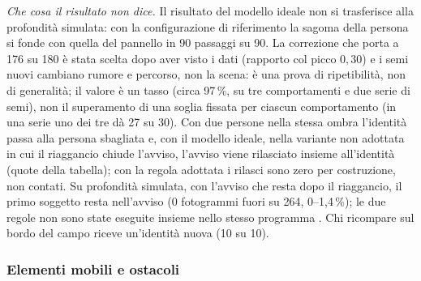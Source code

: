 \emph{Che cosa il risultato non dice.} Il risultato del modello ideale non si trasferisce alla profondità simulata: con la configurazione di riferimento la sagoma della persona si fonde con quella del pannello in 90 passaggi su 90. La correzione che porta a 176 su 180 è stata scelta dopo aver visto i dati (rapporto col picco $0{,}30$) e i semi nuovi cambiano rumore e percorso, non la scena: è una prova di ripetibilità, non di generalità; il valore è un tasso (circa 97\,\%, su tre comportamenti e due serie di semi), non il superamento di una soglia fissata per ciascun comportamento (in una serie uno dei tre dà 27 su 30). Con due persone nella stessa ombra l'identità passa alla persona sbagliata e, con il modello ideale, nella variante non adottata in cui il riaggancio chiude l'avviso, l'avviso viene rilasciato insieme all'identità (quote della tabella); con la regola adottata i rilasci sono zero per costruzione, non contati. Su profondità simulata, con l'avviso che resta dopo il riaggancio, il primo soggetto resta nell'avviso (0 fotogrammi fuori su 264, 0–1,4\,\%); le due regole non sono state eseguite insieme nello stesso programma . Chi ricompare sul bordo del campo riceve un'identità nuova (10 su 10).

\subsubsection*{Elementi mobili e ostacoli}

